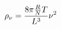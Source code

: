 \documentclass[preview]{standalone}
\begin{document}
\begin{align*}
\rho_{\nu}  = { 8\pi \frac{R}{N}T  \over  L^3  } \nu^2
\end{align*}
\end{document}
